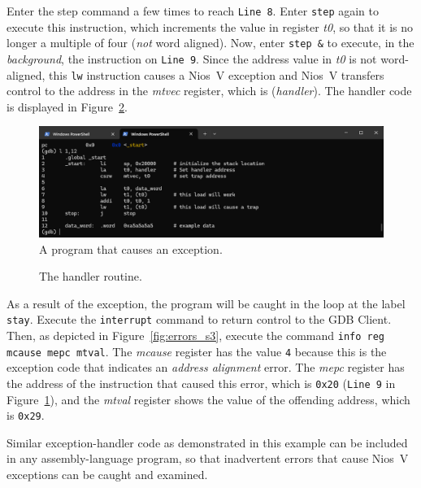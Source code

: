 \documentclass[11pt, twoside, pdftex]{article}
\begin{document}
Enter the step command a few times to reach \texttt{Line 8}. Enter \texttt{step} again to 
execute this instruction, which increments the value in register {\it t0}, so that it is no 
longer a multiple of four ({\it not} word aligned). Now, enter \texttt{step \&} to
execute, in the {\it background}, the 
instruction on \texttt{Line 9}. Since the address value in {\it t0} is not word-aligned, 
this \texttt{lw} instruction causes a Nios~V exception and Nios~V transfers control to the 
address in the {\it mtvec} register, which is ({\it handler}). The handler code is
displayed in Figure~\ref{fig:errors_s2}. 

\begin{figure}[h]
    \begin{center}
        \includegraphics[scale=.6]{figures/errors_s1.png}
        \caption{A program that causes an exception.}
        \label{fig:errors_s1}
    \end{center}
\end{figure}

\begin{figure}[H]

	\caption{The handler routine.}
	\label{fig:errors_s2}
\end{figure}

As a result of the exception, the program will be caught in the loop at the label \texttt{stay}. 
Execute the \texttt{interrupt} command to return control to the GDB Client. Then, as depicted in 
Figure~\ref{fig:errors_s3}, execute the command \texttt{info reg mcause mepc mtval}. The
{\it mcause} register has the value \texttt{4} because this is the exception code that
indicates an {\it address alignment} error. The {\it mepc} register has the address of the
instruction that caused this error, which is \texttt{0x20} (\texttt{Line 9} in
Figure~\ref{fig:errors_s1}), and the {\it mtval} register shows the value of the offending
address, which is \texttt{0x29}. 

Similar exception-handler code as demonstrated in this example can be included in any
assembly-language program, so that inadvertent errors that cause Nios~V exceptions can be 
caught and examined. 
\end{document}
